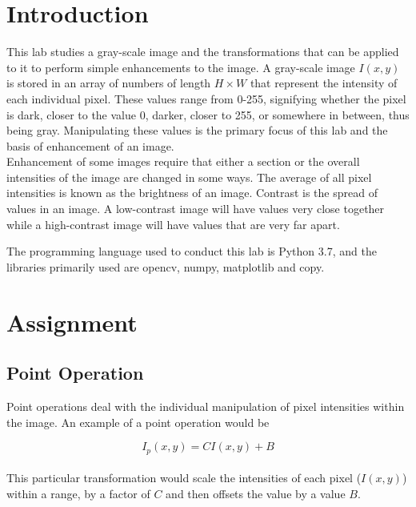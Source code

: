 \documentclass{article}
\begin{document}
	
	
	
	\section{Introduction}
	
	This lab studies a gray-scale image and the transformations that can be applied to it to perform simple enhancements to the image. A gray-scale image $I(x,y)$ is stored in an array of numbers of length $H \times W$ that represent the intensity of each individual pixel. These values range from 0-255, signifying whether the pixel is dark, closer to the value 0, darker, closer to 255, or somewhere in between, thus being gray. Manipulating these values is the primary focus of this lab and the basis of enhancement of an image. \\
	
	Enhancement of some images require that either a section or the overall intensities of the image are changed in some ways. The average of all pixel intensities is known as the brightness of an image. Contrast is the spread of values in an image. A low-contrast image will have values very close together while a high-contrast image will have values that are very far apart. \newline
	
	The programming language used to conduct this lab is Python 3.7, and the libraries primarily used are opencv, numpy, matplotlib and copy.
	
	\section{Assignment}
	
	\subsection{Point Operation}
	
	Point operations deal with the individual manipulation of pixel intensities within the image. An example of a point operation would be \newline
	
	\begin{equation}
	I_{p}(x,y) = CI(x,y) + B 
	\end{equation} \\
	
	This particular transformation would scale the intensities of each pixel ($I(x,y)$) within a range, by a factor of $C$ and then offsets the value by a value $B$. \newline
	
\end{document}
